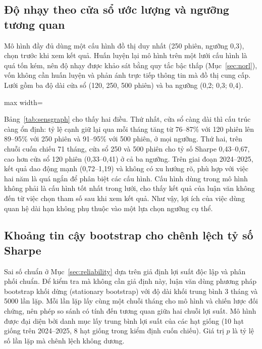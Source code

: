 \subsection{Độ nhạy theo cửa sổ ước lượng và ngưỡng tương quan}

Mô hình đầy đủ dùng một cấu hình đồ thị duy nhất (250 phiên, ngưỡng 0,3), chọn trước khi xem kết quả. Huấn luyện lại mô hình trên một lưới cấu hình là quá tốn kém, nên độ nhạy được khảo sát bằng quy tắc bậc thấp (Mục~\ref{sec:norl}), vốn không cần huấn luyện và phản ánh trực tiếp thông tin mà đồ thị cung cấp. Lưới gồm ba độ dài cửa sổ (120, 250, 500 phiên) và ba ngưỡng (0,2; 0,3; 0,4).

\begin{table}[ht]
\centering\footnotesize
\setlength{\tabcolsep}{4pt}
\caption{Độ nhạy theo cửa sổ và ngưỡng của đồ thị, đo bằng quy tắc bậc thấp không học. Mật độ và tỷ lệ cạnh giữ lại qua mỗi tháng tính trên 2024--2025; in đậm: cấu hình dùng trong mô hình}
\label{tab:sensgraph}
\begin{adjustbox}{max width=\textwidth}\end{adjustbox}
\end{table}

Bảng~\ref{tab:sensgraph} cho thấy hai điều. Thứ nhất, cửa sổ càng dài thì cấu trúc càng ổn định: tỷ lệ cạnh giữ lại qua mỗi tháng tăng từ 76--87\% với 120 phiên lên 89--95\% với 250 phiên và 91--95\% với 500 phiên, ở mọi ngưỡng. Thứ hai, trên chuỗi cuốn chiếu 71 tháng, cửa sổ 250 và 500 phiên cho tỷ số Sharpe 0,43--0,67, cao hơn cửa sổ 120 phiên (0,33--0,41) ở cả ba ngưỡng. Trên giai đoạn 2024--2025, kết quả dao động mạnh (0,72--1,19) và không có xu hướng rõ, phù hợp với việc hai năm là quá ngắn để phân biệt các cấu hình. Cấu hình dùng trong mô hình không phải là cấu hình tốt nhất trong lưới, cho thấy kết quả của luận văn không đến từ việc chọn tham số sau khi xem kết quả. Như vậy, lợi ích của việc dùng quan hệ dài hạn không phụ thuộc vào một lựa chọn ngưỡng cụ thể.

\subsection{Khoảng tin cậy bootstrap cho chênh lệch tỷ số Sharpe}

Sai số chuẩn ở Mục~\ref{sec:reliability} dựa trên giả định lợi suất độc lập và phân phối chuẩn. Để kiểm tra mà không cần giả định này, luận văn dùng phương pháp bootstrap khối dừng (stationary bootstrap) với độ dài khối trung bình 3 tháng và 5000 lần lặp. Mỗi lần lặp lấy cùng một chuỗi tháng cho mô hình và chiến lược đối chứng, nên phép so sánh có tính đến tương quan giữa hai chuỗi lợi suất. Mô hình được đại diện bởi danh mục lấy trung bình lợi suất của các hạt giống (10 hạt giống trên 2024--2025, 8 hạt giống trong kiểm định cuốn chiếu). Giá trị $p$ là tỷ lệ số lần lặp mà chênh lệch không dương.

